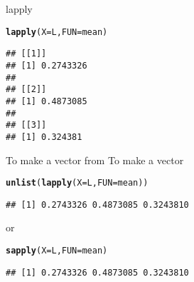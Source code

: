 \documentclass[aspectratio=169]{beamer}\usepackage[]{graphicx}\usepackage[]{xcolor}
\makeatletter
\newcommand{\hldef}[1]{\textcolor[rgb]{0.345,0.345,0.345}{#1}}%
\newcommand{\hlkwc}[1]{\textcolor[rgb]{0.333,0.667,0.333}{#1}}%
\newcommand{\hlkwd}[1]{\textcolor[rgb]{0.737,0.353,0.396}{\textbf{#1}}}%
\newenvironment{kframe}{%
 \def\at@end@of@kframe{}%
 \ifinner\ifhmode%
  \def\at@end@of@kframe{\end{minipage}}%
  \begin{minipage}{\columnwidth}%
 \fi\fi%
 \def\FrameCommand##1{\hskip\@totalleftmargin \hskip-\fboxsep
 \colorbox{shadecolor}{##1}\hskip-\fboxsep
     \hskip-\linewidth \hskip-\@totalleftmargin \hskip\columnwidth}%
 \MakeFramed {\advance\hsize-\width
   \@totalleftmargin\z@ \linewidth\hsize
   \@setminipage}}%
 {\par\unskip\endMakeFramed%
 \at@end@of@kframe}
\newenvironment{knitrout}{}{} %
\makeatother
\begin{document}
\begin{frame}[fragile]{lapply}
\begin{knitrout}
\color{fgcolor}\begin{kframe}
\begin{alltt}
\hlkwd{lapply}\hldef{(}\hlkwc{X} \hldef{= L,} \hlkwc{FUN} \hldef{= mean)}
\end{alltt}
\begin{verbatim}
## [[1]]
## [1] 0.2743326
## 
## [[2]]
## [1] 0.4873085
## 
## [[3]]
## [1] 0.324381
\end{verbatim}
\end{kframe}
\end{knitrout}
\end{frame}

\begin{frame}[fragile]{To make a vector from }
To make a vector
\begin{knitrout}
\color{fgcolor}\begin{kframe}
\begin{alltt}
\hlkwd{unlist}\hldef{(}\hlkwd{lapply}\hldef{(}\hlkwc{X} \hldef{= L,} \hlkwc{FUN} \hldef{= mean))}
\end{alltt}
\begin{verbatim}
## [1] 0.2743326 0.4873085 0.3243810
\end{verbatim}
\end{kframe}
\end{knitrout}
or
\begin{knitrout}
\color{fgcolor}\begin{kframe}
\begin{alltt}
\hlkwd{sapply}\hldef{(}\hlkwc{X} \hldef{= L,} \hlkwc{FUN} \hldef{= mean)}
\end{alltt}
\begin{verbatim}
## [1] 0.2743326 0.4873085 0.3243810
\end{verbatim}
\end{kframe}
\end{knitrout}
\end{frame} 
\end{document}
